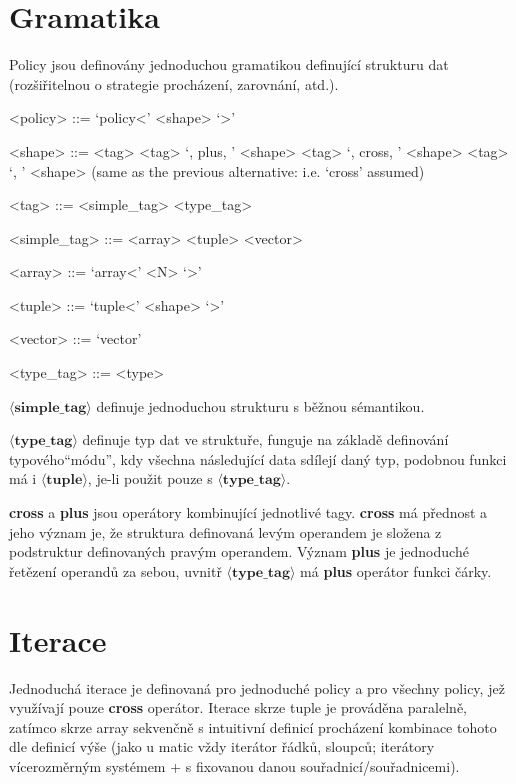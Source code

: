 \documentclass[a4paper,12pt]{article}
\begin{document}
    \section{Gramatika}

    Policy jsou definovány jednoduchou gramatikou definující strukturu dat (rozšiřitelnou o strategie procházení, zarovnání, atd.).

    \begin{grammar}
        <policy> ::= `policy<' <shape> `>'

        <shape> ::= <tag>
        \alt <tag> `, plus, ' <shape>
        \alt <tag> `, cross, ' <shape>
        \alt <tag> `, ' <shape> (same as the previous alternative: i.e. `cross' assumed)

        <tag> ::= <simple_tag>
        \alt <type_tag>

        <simple_tag> ::= <array>
        \alt <tuple>
        \alt <vector>

        <array> ::= `array<' <N> `>'

        <tuple> ::= `tuple<' <shape> `>'

        <vector> ::= `vector'

        <type_tag> ::= <type>
    \end{grammar}

    $\mathbf{\langle simple\_tag \rangle}$ definuje jednoduchou strukturu s běžnou sémantikou.

    $\mathbf{\langle type\_tag \rangle}$ definuje typ dat ve struktuře, funguje na základě definování typového\linebreak``módu'', kdy všechna následující data sdílejí daný typ, podobnou funkci má i $\mathbf{\langle tuple \rangle}$, je-li použit pouze s $\mathbf{\langle type\_tag \rangle}$.

    \textbf{cross} a \textbf{plus} jsou operátory kombinující jednotlivé tagy.
    \textbf{cross} má přednost a jeho význam je, že struktura definovaná levým operandem je složena z podstruktur definovaných pravým operandem. Význam \textbf{plus} je jednoduché řetězení operandů za sebou, uvnitř $\mathbf{\langle type\_tag \rangle}$ má \textbf{plus} operátor funkci čárky.

    \section{Iterace}

    Jednoduchá iterace je definovaná pro jednoduché policy a pro všechny policy, jež využívají pouze \textbf{cross} operátor. Iterace skrze tuple je prováděna paralelně, zatímco skrze array sekvenčně s intuitivní definicí procházení kombinace tohoto dle definicí výše (jako u matic vždy iterátor řádků, sloupců; iterátory vícerozměrným systémem + s fixovanou danou souřadnicí/souřadnicemi).
\end{document}
